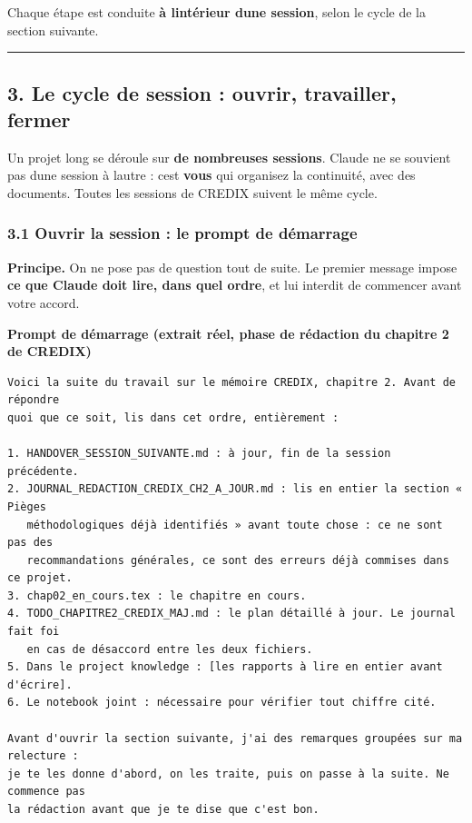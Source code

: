 \documentclass[
  french,
  11pt,
  a4paper,
]{article}
\begin{document}
Chaque étape est conduite \textbf{à l\textquotesingle intérieur
d\textquotesingle une session}, selon le cycle de la section suivante.

\begin{center}\rule{0.5\linewidth}{0.5pt}\end{center}

\subsection{3. Le cycle de session : ouvrir, travailler,
fermer}\label{3-le-cycle-de-session--ouvrir-travailler-fermer}

Un projet long se déroule sur \textbf{de nombreuses sessions}. Claude ne
se souvient pas d\textquotesingle une session à l\textquotesingle autre
: c\textquotesingle est \textbf{vous} qui organisez la continuité, avec
des documents. Toutes les sessions de CREDIX suivent le même cycle.

\subsubsection{3.1 Ouvrir la session : le prompt de
démarrage}\label{31-ouvrir-la-session--le-prompt-de-duxe9marrage}

\textbf{Principe.} On ne pose pas de question tout de suite. Le premier
message impose \textbf{ce que Claude doit lire, dans quel ordre}, et lui
interdit de commencer avant votre accord.

\textbf{Prompt de démarrage (extrait réel, phase de rédaction du
chapitre 2 de CREDIX)}

\begin{Verbatim}[breaklines=true,breakanywhere=true,fontsize=\small,frame=leftline,framerule=1.6pt,rulecolor=\color{credixblue},framesep=3mm,xleftmargin=2mm,xrightmargin=1mm]
Voici la suite du travail sur le mémoire CREDIX, chapitre 2. Avant de répondre
quoi que ce soit, lis dans cet ordre, entièrement :

1. HANDOVER_SESSION_SUIVANTE.md : à jour, fin de la session précédente.
2. JOURNAL_REDACTION_CREDIX_CH2_A_JOUR.md : lis en entier la section « Pièges
   méthodologiques déjà identifiés » avant toute chose : ce ne sont pas des
   recommandations générales, ce sont des erreurs déjà commises dans ce projet.
3. chap02_en_cours.tex : le chapitre en cours.
4. TODO_CHAPITRE2_CREDIX_MAJ.md : le plan détaillé à jour. Le journal fait foi
   en cas de désaccord entre les deux fichiers.
5. Dans le project knowledge : [les rapports à lire en entier avant d'écrire].
6. Le notebook joint : nécessaire pour vérifier tout chiffre cité.

Avant d'ouvrir la section suivante, j'ai des remarques groupées sur ma relecture :
je te les donne d'abord, on les traite, puis on passe à la suite. Ne commence pas
la rédaction avant que je te dise que c'est bon.
\end{Verbatim}
\end{document}
